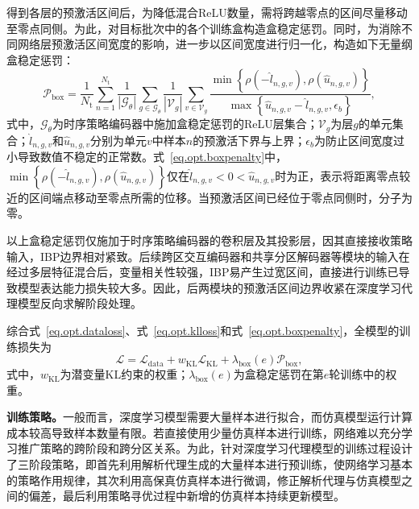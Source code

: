 得到各层的预激活区间后，为降低混合ReLU数量，需将跨越零点的区间尽量移动至零点同侧。为此，对目标批次中的各个训练盒构造盒稳定惩罚。同时，为消除不同网络层预激活区间宽度的影响，进一步以区间宽度进行归一化，构造如下无量纲盒稳定惩罚：
\begin{equation}
\mathcal{P}_{\mathrm{box}}
=\frac{1}{N_{\mathrm{t}}}
\sum_{n=1}^{N_{\mathrm{t}}}
\frac{1}{|\mathcal{G}_{\theta}|}
\sum_{g\in\mathcal{G}_{\theta}}
\frac{1}{|\mathcal{V}_{g}|}
\sum_{v\in\mathcal{V}_{g}}
\frac{
\min\left\{
\rho(-\hat{l}_{n,g,v}),
\rho(\hat{u}_{n,g,v})
\right\}}
{\max\left\{
\hat{u}_{n,g,v}-\hat{l}_{n,g,v},\epsilon_b
\right\}},
\label{eq.opt.boxpenalty}
\end{equation}
式中，$\mathcal{G}_{\theta}$为时序策略编码器中施加盒稳定惩罚的ReLU层集合；$\mathcal{V}_{g}$为层$g$的单元集合；$\hat{l}_{n,g,v}$和$\hat{u}_{n,g,v}$分别为单元$v$中样本$n$的预激活下界与上界；$\epsilon_b$为防止区间宽度过小导致数值不稳定的正常数。式~\eqref{eq.opt.boxpenalty}中，$\min\left\{\rho(-\hat{l}_{n,g,v}),\rho(\hat{u}_{n,g,v})\right\}$仅在$\hat{l}_{n,g,v}<0<\hat{u}_{n,g,v}$时为正，表示将距离零点较近的区间端点移动至零点所需的位移。当预激活区间已经位于零点同侧时，分子为零。

以上盒稳定惩罚仅施加于时序策略编码器的卷积层及其投影层，因其直接接收策略输入，IBP边界相对紧致。后续跨区交互编码器和共享分区解码器等模块的输入在经过多层特征混合后，变量相关性较强，IBP易产生过宽区间，直接进行训练已导致模型表达能力损失较大多。因此，后两模块的预激活区间边界收紧在深度学习代理模型反向求解阶段处理。

综合式~\eqref{eq.opt.dataloss}、式~\eqref{eq.opt.klloss}和式~\eqref{eq.opt.boxpenalty}，全模型的训练损失为
\begin{equation}
\mathcal{L}
=
\mathcal{L}_{\mathrm{data}}
+w_{\mathrm{KL}}\mathcal{L}_{\mathrm{KL}}
+\lambda_{\mathrm{box}}(e)\mathcal{P}_{\mathrm{box}},
\label{eq.opt.loss}
\end{equation}
式中，$w_{\mathrm{KL}}$为潜变量KL约束的权重；$\lambda_{\mathrm{box}}(e)$为盒稳定惩罚在第$e$轮训练中的权重。

\textbf{训练策略。}一般而言，深度学习模型需要大量样本进行拟合，而仿真模型运行计算成本较高导致样本数量有限。若直接使用少量仿真样本进行训练，网络难以充分学习推广策略的跨阶段和跨分区关系。为此，针对深度学习代理模型的训练过程设计了三阶段策略，即首先利用解析代理生成的大量样本进行预训练，使网络学习基本的策略作用规律，其次利用高保真仿真样本进行微调，修正解析代理与仿真模型之间的偏差，最后利用策略寻优过程中新增的仿真样本持续更新模型。

